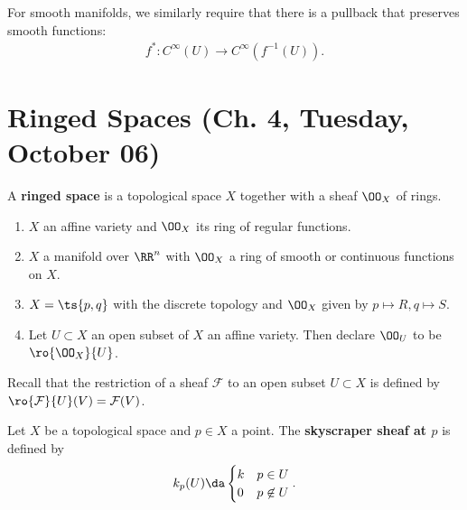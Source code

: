\begin{example}

For smooth manifolds, we similarly require that there is a pullback that
preserves smooth functions:
\begin{align*}  
f^*: C^\infty(U) \to C^\infty(f^{-1}(U))
.\end{align*}

\end{example}

\hypertarget{ringed-spaces-ch.-4-tuesday-october-06}{%
\section{Ringed Spaces (Ch. 4, Tuesday, October
06)}\label{ringed-spaces-ch.-4-tuesday-october-06}}

\begin{definition}

A \textbf{ringed space} is a topological space \(X\) together with a
sheaf \(\OO_X\) of rings.

\end{definition}

\begin{example}

\envlist

\begin{enumerate}
\def\labelenumi{\arabic{enumi}.}
\item
  \(X\) an affine variety and \(\OO_X\) its ring of regular functions.
\item
  \(X\) a manifold over \(\RR^n\) with \(\OO_X\) a ring of smooth or
  continuous functions on \(X\).
\item
  \(X = \ts{p, q}\) with the discrete topology and \(\OO_X\) given by
  \(p\mapsto R, q\mapsto S\).
\item
  Let \(U\subset X\) an open subset of \(X\) an affine variety. Then
  declare \(\OO_U\) to be \(\ro{\OO_X}{U}\).
\end{enumerate}

\end{example}

Recall that the restriction of a sheaf \(\mathcal{F}\) to an open subset
\(U\subset X\) is defined by
\(\ro{\mathcal{F}}{U}(V) = \mathcal{F}(V)\).

\begin{example}

Let \(X\) be a topological space and \(p\in X\) a point. The
\textbf{skyscraper sheaf at \(p\)} is defined by
\begin{align*}  
k_p(U) \da 
\begin{cases}
k & p\in U \\
0 & p\not\in U
\end{cases}
.\end{align*}

\end{example}


